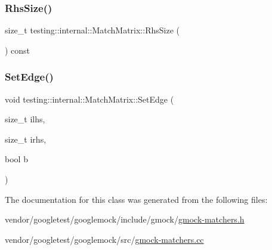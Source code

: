 \mbox{\label{classtesting_1_1internal_1_1_match_matrix_aff068e9fed3a42466c5da8766ac43134}} 
\subsubsection{\texorpdfstring{Rhs\+Size()}{RhsSize()}}
{\footnotesize\ttfamily size\+\_\+t testing\+::internal\+::\+Match\+Matrix\+::\+Rhs\+Size (\begin{DoxyParamCaption}{ }\end{DoxyParamCaption}) const\hspace{0.3cm}{\ttfamily [inline]}}

\mbox{\label{classtesting_1_1internal_1_1_match_matrix_aac7e9c6e0e4b51e6b1334829a0781021}} 
\subsubsection{\texorpdfstring{Set\+Edge()}{SetEdge()}}
{\footnotesize\ttfamily void testing\+::internal\+::\+Match\+Matrix\+::\+Set\+Edge (\begin{DoxyParamCaption}\item[{size\+\_\+t}]{ilhs,  }\item[{size\+\_\+t}]{irhs,  }\item[{bool}]{b }\end{DoxyParamCaption})\hspace{0.3cm}{\ttfamily [inline]}}



The documentation for this class was generated from the following files\+:\begin{DoxyCompactItemize}
\item 
vendor/googletest/googlemock/include/gmock/\hyperlink{gmock-matchers_8h}{gmock-\/matchers.\+h}\item 
vendor/googletest/googlemock/src/\hyperlink{gmock-matchers_8cc}{gmock-\/matchers.\+cc}\end{DoxyCompactItemize}
